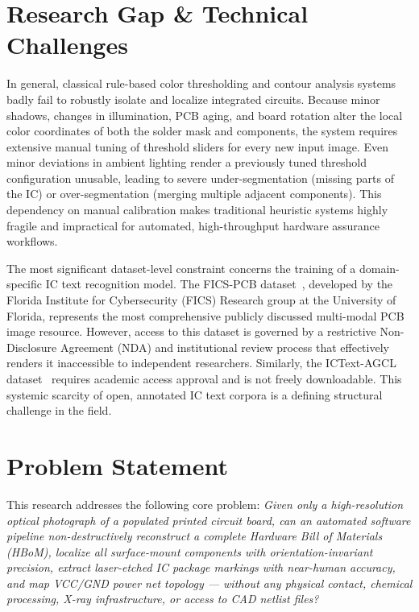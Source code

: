 \documentclass[12pt,a4paper]{report}
\begin{document}
\section{Research Gap \& Technical Challenges}
\label{sec:research_gap}

In general, classical rule-based color thresholding and contour analysis systems badly fail to robustly isolate and localize integrated circuits. Because minor shadows, changes in illumination, PCB aging, and board rotation alter the local color coordinates of both the solder mask and components, the system requires extensive manual tuning of threshold sliders for every new input image. Even minor deviations in ambient lighting render a previously tuned threshold configuration unusable, leading to severe under-segmentation (missing parts of the IC) or over-segmentation (merging multiple adjacent components). This dependency on manual calibration makes traditional heuristic systems highly fragile and impractical for automated, high-throughput hardware assurance workflows.

The most significant dataset-level constraint concerns the training of a domain-specific IC text recognition model. The FICS-PCB dataset~\cite{lu2020ficspcb}, developed by the Florida Institute for Cybersecurity (FICS) Research group at the University of Florida, represents the most comprehensive publicly discussed multi-modal PCB image resource. However, access to this dataset is governed by a restrictive Non-Disclosure Agreement (NDA) and institutional review process that effectively renders it inaccessible to independent researchers. Similarly, the ICText-AGCL dataset~\cite{ng2024ictext} requires academic access approval and is not freely downloadable. This systemic scarcity of open, annotated IC text corpora is a defining structural challenge in the field.

\section{Problem Statement}
\label{sec:problem_statement}

This research addresses the following core problem: \textit{Given only a high-resolution optical photograph of a populated printed circuit board, can an automated software pipeline non-destructively reconstruct a complete Hardware Bill of Materials (HBoM), localize all surface-mount components with orientation-invariant precision, extract laser-etched IC package markings with near-human accuracy, and map VCC/GND power net topology --- without any physical contact, chemical processing, X-ray infrastructure, or access to CAD netlist files?}
\end{document}
